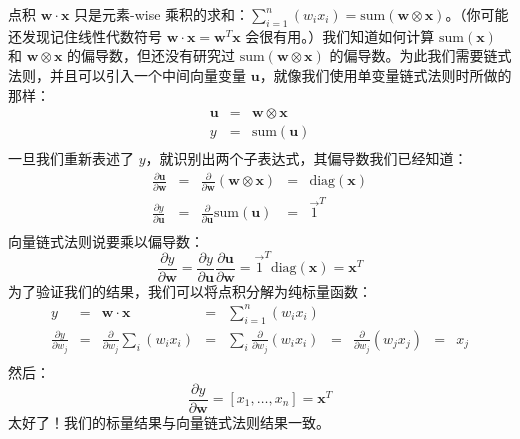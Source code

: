 \documentclass[11pt]{article}
\begin{document}
点积 $\mathbf{w} \cdot \mathbf{x}$ 只是元素-wise 乘积的求和：$\sum_{i=1}^n (w_i x_i) = \text{sum}(\mathbf{w} \otimes \mathbf{x})$。（你可能还发现记住线性代数符号 $\mathbf{w} \cdot \mathbf{x} = \mathbf{w}^{T} \mathbf{x}$ 会很有用。）我们知道如何计算 $\text{sum}(\mathbf{x})$ 和 $\mathbf{w} \otimes \mathbf{x}$ 的偏导数，但还没有研究过 $\text{sum}(\mathbf{w} \otimes \mathbf{x})$ 的偏导数。为此我们需要链式法则，并且可以引入一个中间向量变量 $\mathbf{u}$，就像我们使用单变量链式法则时所做的那样：
\[
\begin{array}{lllllllll}
 \mathbf{u} &=& \mathbf{w} \otimes \mathbf{x} \\
 y &=& \text{sum}(\mathbf{u}) \\
\end{array}
\]
一旦我们重新表述了 $y$，就识别出两个子表达式，其偏导数我们已经知道：
\[
\begin{array}{lllllllll}
 \frac{\partial \mathbf{u}}{\partial \mathbf{w}} &=& \frac{\partial }{\partial \mathbf{w}} (\mathbf{w} \otimes \mathbf{x}) &=& \text{diag}(\mathbf{x}) \\
 \frac{\partial y}{\partial \mathbf{u}} &=& \frac{\partial }{\partial \mathbf{u}} \text{sum}(\mathbf{u}) &=& \vec{1}^T \\
\end{array}
\]
向量链式法则说要乘以偏导数：
\[\frac{\partial y}{\partial \mathbf{w}} = \frac{\partial y}{\partial \mathbf{u}} \frac{\partial \mathbf{u}}{\partial \mathbf{w}} = \vec{1}^T \text{diag}(\mathbf{x}) = \mathbf{x}^T\]
为了验证我们的结果，我们可以将点积分解为纯标量函数：
\[
\begin{array}{lllllllll}
 y &=& \mathbf{w} \cdot \mathbf{x} &=& \sum_{i=1}^n (w_i x_i) \\
 \frac{\partial y}{\partial w_j} &=& \frac{\partial}{\partial w_j} \sum_i (w_i x_i) &=& \sum_i \frac{\partial}{\partial w_j} (w_i x_i) &=& \frac{\partial}{\partial w_j} (w_j x_j) &=& x_j \\
\end{array}
\]
然后：
\[\frac{\partial y}{\partial \mathbf{w}} = [ x_1, \ldots, x_n ] = \mathbf{x}^T\]
太好了！我们的标量结果与向量链式法则结果一致。
\end{document}
